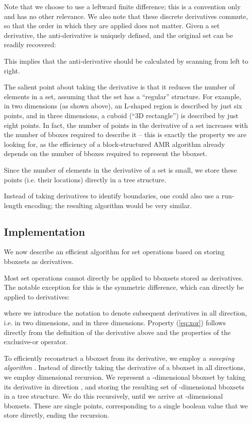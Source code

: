 \documentclass[conference]{IEEEtran}
\begin{document}
Note that we choose to use a leftward finite difference; this is a
convention only and has no other relevance. We also note that these
discrete derivatives commute, so that the order in which they are
applied does not matter. Given a set derivative, the anti-derivative
is uniquely defined, and the original set can be readily
recovered:

This implies that the anti-derivative should be calculated by scanning
from left to right.

The salient point about taking the derivative is that it reduces the
number of elements in a set, assuming that the set has a ``regular''
structure. For example, in two dimensions (as shown
above), an L-shaped region is described by just six points, and in
three dimensions, a cuboid (``3D rectangle'') is described by just eight
points. In fact, the number of points in the derivative of a set
increases with the number of bboxes required to describe it -- this is
exactly the property we are looking for, as the efficiency of a
block-structured AMR algorithm already depends on the number of bboxes
required to represent the bboxset.

Since the number of elements in the derivative of a set is small, we store
these points (i.e. their locations) directly in a tree structure.

Instead of taking derivatives to identify boundaries, one could also
use a run-length encoding; the resulting algorithm would be very
similar.

\subsection{Implementation}

We now describe an efficient algorithm for set operations based on
storing bboxsets as derivatives.

Most set
operations cannot directly be applied to bboxsets stored as
derivatives.
The notable exception for this is the symmetric difference, which can
directly be applied to derivatives:

where we introduce the notation  to denote subsequent
derivatives in all direction, i.e.  in two dimensions, and  in three dimensions.
Property (\ref{eq:xor}) follows directly
from the definition of the derivative above and the properties of the
exclusive-or operator.

To efficiently reconstruct a bboxset from its derivative, we employ a
\emph{sweeping algorithm} \cite{wiki:sweeping}.
Instead of
directly taking the derivative of a bboxset  in all directions, we
employ dimensional recursion. We represent a -dimensional bboxset
by taking its derivative in direction , and storing the resulting
set of -dimensional bboxsets in a tree structure. We do this
recursively, until we arrive at -dimensional bboxsets. These are
single points, corresponding to a single boolean value that we store
directly, ending the recursion.
\end{document}

